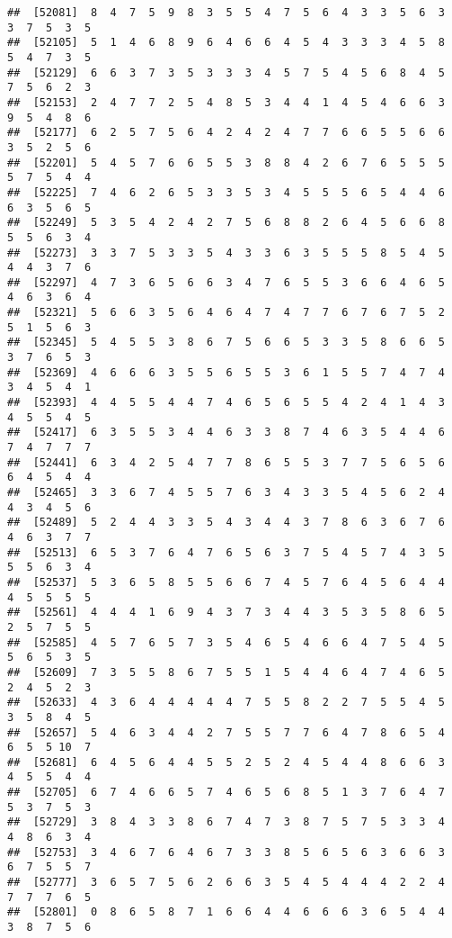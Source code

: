 \documentclass[
]{book}
\begin{document}
\begin{verbatim}
##  [52081]  8  4  7  5  9  8  3  5  5  4  7  5  6  4  3  3  5  6  3  3  7  5  3  5
##  [52105]  5  1  4  6  8  9  6  4  6  6  4  5  4  3  3  3  4  5  8  5  4  7  3  5
##  [52129]  6  6  3  7  3  5  3  3  3  4  5  7  5  4  5  6  8  4  5  7  5  6  2  3
##  [52153]  2  4  7  7  2  5  4  8  5  3  4  4  1  4  5  4  6  6  3  9  5  4  8  6
##  [52177]  6  2  5  7  5  6  4  2  4  2  4  7  7  6  6  5  5  6  6  3  5  2  5  6
##  [52201]  5  4  5  7  6  6  5  5  3  8  8  4  2  6  7  6  5  5  5  5  7  5  4  4
##  [52225]  7  4  6  2  6  5  3  3  5  3  4  5  5  5  6  5  4  4  6  6  3  5  6  5
##  [52249]  5  3  5  4  2  4  2  7  5  6  8  8  2  6  4  5  6  6  8  5  5  6  3  4
##  [52273]  3  3  7  5  3  3  5  4  3  3  6  3  5  5  5  8  5  4  5  4  4  3  7  6
##  [52297]  4  7  3  6  5  6  6  3  4  7  6  5  5  3  6  6  4  6  5  4  6  3  6  4
##  [52321]  5  6  6  3  5  6  4  6  4  7  4  7  7  6  7  6  7  5  2  5  1  5  6  3
##  [52345]  5  4  5  5  3  8  6  7  5  6  6  5  3  3  5  8  6  6  5  3  7  6  5  3
##  [52369]  4  6  6  6  3  5  5  6  5  5  3  6  1  5  5  7  4  7  4  3  4  5  4  1
##  [52393]  4  4  5  5  4  4  7  4  6  5  6  5  5  4  2  4  1  4  3  4  5  5  4  5
##  [52417]  6  3  5  5  3  4  4  6  3  3  8  7  4  6  3  5  4  4  6  7  4  7  7  7
##  [52441]  6  3  4  2  5  4  7  7  8  6  5  5  3  7  7  5  6  5  6  6  4  5  4  4
##  [52465]  3  3  6  7  4  5  5  7  6  3  4  3  3  5  4  5  6  2  4  4  3  4  5  6
##  [52489]  5  2  4  4  3  3  5  4  3  4  4  3  7  8  6  3  6  7  6  4  6  3  7  7
##  [52513]  6  5  3  7  6  4  7  6  5  6  3  7  5  4  5  7  4  3  5  5  5  6  3  4
##  [52537]  5  3  6  5  8  5  5  6  6  7  4  5  7  6  4  5  6  4  4  4  5  5  5  5
##  [52561]  4  4  4  1  6  9  4  3  7  3  4  4  3  5  3  5  8  6  5  2  5  7  5  5
##  [52585]  4  5  7  6  5  7  3  5  4  6  5  4  6  6  4  7  5  4  5  5  6  5  3  5
##  [52609]  7  3  5  5  8  6  7  5  5  1  5  4  4  6  4  7  4  6  5  2  4  5  2  3
##  [52633]  4  3  6  4  4  4  4  4  7  5  5  8  2  2  7  5  5  4  5  3  5  8  4  5
##  [52657]  5  4  6  3  4  4  2  7  5  5  7  7  6  4  7  8  6  5  4  6  5  5 10  7
##  [52681]  6  4  5  6  4  4  5  5  2  5  2  4  5  4  4  8  6  6  3  4  5  5  4  4
##  [52705]  6  7  4  6  6  5  7  4  6  5  6  8  5  1  3  7  6  4  7  5  3  7  5  3
##  [52729]  3  8  4  3  3  8  6  7  4  7  3  8  7  5  7  5  3  3  4  4  8  6  3  4
##  [52753]  3  4  6  7  6  4  6  7  3  3  8  5  6  5  6  3  6  6  3  6  7  5  5  7
##  [52777]  3  6  5  7  5  6  2  6  6  3  5  4  5  4  4  4  2  2  4  7  7  7  6  5
##  [52801]  0  8  6  5  8  7  1  6  6  4  4  6  6  6  3  6  5  4  4  3  8  7  5  6

\end{verbatim}
\end{document}
